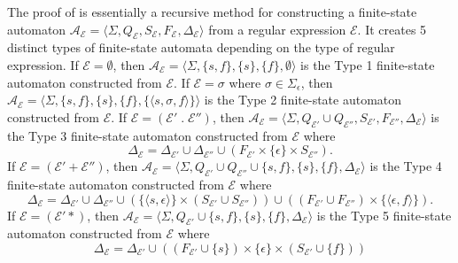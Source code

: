 The proof of  is essentially a recursive method for constructing a
finite-state automaton $\mathcal{A}_\mathcal{E} = \langle \Sigma, Q_\mathcal{E},
S_\mathcal{E}, F_\mathcal{E}, \Delta_\mathcal{E} \rangle$ from a regular expression
$\mathcal{E}$. It creates 5 distinct types of finite-state automata depending on the
type of regular expression. If $\mathcal{E} = \emptyset$, then
$\mathcal{A}_\mathcal{E} = \langle \Sigma, \{ s, f \}, \{ s \}, \{ f \}, \emptyset
\rangle$ is the Type 1 finite-state automaton constructed from $\mathcal{E}$. If
$\mathcal{E} = \sigma$ where $\sigma \in \Sigma_\epsilon$, then
$\mathcal{A}_\mathcal{E} = \langle \Sigma, \{ s, f \}, \{ s \}, \{ f \}, \{ \langle
s, \sigma, f \rangle \} \rangle$ is the Type 2 finite-state automaton constructed
from $\mathcal{E}$. If $\mathcal{E} = (\mathcal{E}'\;.\;\mathcal{E}'')$, then
$\mathcal{A}_\mathcal{E} = \langle \Sigma, Q_{\mathcal{E}'} \cup Q_{\mathcal{E}''},
S_{\mathcal{E}'}, F_{\mathcal{E}''}, \Delta_\mathcal{E} \rangle$ is the Type 3
finite-state automaton constructed from $\mathcal{E}$ where
\begin{equation*}
  \Delta_\mathcal{E} = \Delta_{\mathcal{E}'} \cup \Delta_{\mathcal{E}''} \cup
  (F_{\mathcal{E}'} \times \{ \epsilon \} \times S_{\mathcal{E}''}).
\end{equation*}
If $\mathcal{E} = (\mathcal{E}'+\mathcal{E}'')$, then $\mathcal{A}_\mathcal{E} =
\langle \Sigma, Q_{\mathcal{E}'} \cup Q_{\mathcal{E}''} \cup \{ s, f \}, \{ s \}, \{
f \}, \Delta_\mathcal{E} \rangle$ is the Type 4 finite-state automaton constructed
from $\mathcal{E}$ where
\begin{equation*}
  \Delta_\mathcal{E} = \Delta_{\mathcal{E}'} \cup \Delta_{\mathcal{E}''} \cup (\{
  \langle s, \epsilon \rangle \} \times (S_{\mathcal{E}'} \cup S_{\mathcal{E}''}))
  \cup ((F_{\mathcal{E}'} \cup F_{\mathcal{E}''}) \times \{ \langle \epsilon, f
  \rangle \}).
\end{equation*}
If $\mathcal{E} = (\mathcal{E}'*)$, then $\mathcal{A}_\mathcal{E} = \langle \Sigma,
Q_{\mathcal{E}'} \cup \{ s, f \}, \{ s \}, \{ f \}, \Delta_\mathcal{E} \rangle$ is
the Type 5 finite-state automaton constructed from $\mathcal{E}$ where
\begin{equation*}
  \Delta_\mathcal{E} = \Delta_{\mathcal{E}'} \cup ((F_{\mathcal{E}'} \cup \{ s \})
  \times \{ \epsilon \} \times (S_{\mathcal{E}'} \cup \{ f \}))
\end{equation*}

